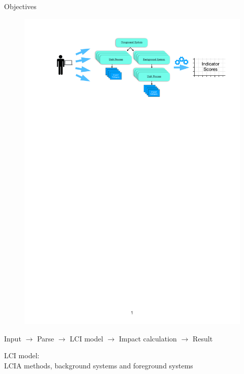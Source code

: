 \begin{frame}{Objectives}

\begin{figure}
    \centering
    \includegraphics[width = \linewidth]{.figures/ProgramParts.pdf}
\end{figure}

Input $\rightarrow$ Parse $\rightarrow$ LCI model $\rightarrow$ Impact calculation $\rightarrow$ Result

LCI model:\\
LCIA methods, background systems and foreground systems
\vfill
\end{frame}

